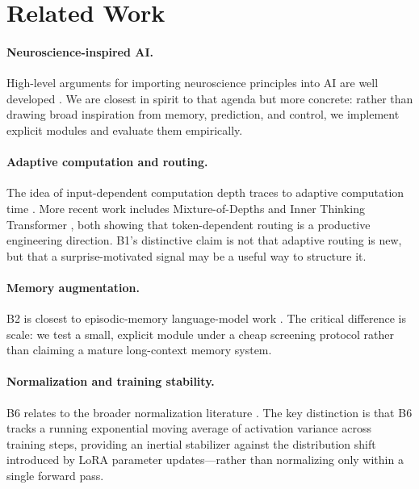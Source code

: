 \documentclass[11pt]{article}
\begin{document}
\section{Related Work}

\paragraph{Neuroscience-inspired AI.}
High-level arguments for importing neuroscience principles into AI are well
developed \citep{hassabis2017neuroscience}.
We are closest in spirit to that agenda but more concrete: rather than drawing
broad inspiration from memory, prediction, and control, we implement explicit
modules and evaluate them empirically.

\paragraph{Adaptive computation and routing.}
The idea of input-dependent computation depth traces to adaptive computation
time \citep{graves2016act}.
More recent work includes Mixture-of-Depths \citep{raposo2024mod} and Inner
Thinking Transformer \citep{itt2025}, both showing that token-dependent routing
is a productive engineering direction.
B1's distinctive claim is not that adaptive routing is new, but that a
surprise-motivated signal may be a useful way to structure it.

\paragraph{Memory augmentation.}
B2 is closest to episodic-memory language-model work \citep{emllm2025}.
The critical difference is scale: we test a small, explicit module under a cheap
screening protocol rather than claiming a mature long-context memory system.

\paragraph{Normalization and training stability.}
B6 relates to the broader normalization literature
\citep{ba2016layernorm,zhang2019rmsnorm}.
The key distinction is that B6 tracks a running exponential moving average of
activation variance across training steps, providing an inertial stabilizer
against the distribution shift introduced by LoRA parameter updates---rather
than normalizing only within a single forward pass.
\end{document}
